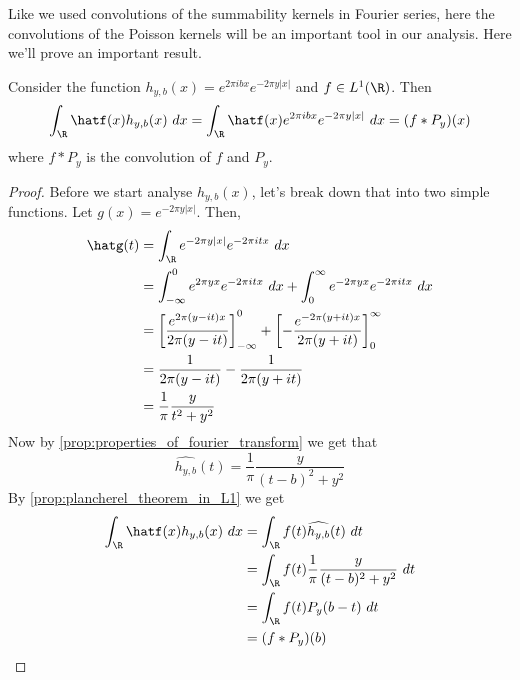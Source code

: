 Like we used convolutions of the summability kernels in Fourier series, here the convolutions of the Poisson kernels will be an important tool in our analysis. Here we'll prove an important result. 
\begin{proposition}
\label{prop:convolution_of_poisson_kernel}
  Consider the function $h_{y,b}(x) = e^{2\pi i b x}e^{-2 \pi y|x|} $ and $f \in L^1(\R)$. Then $$\int_\R \hatf(x)h_{y, b}(x) \ dx = \int_\R \hatf(x) e^{2\pi i b x}e^{-2\pi y |x|} \ dx = (f*P_y)(x)$$
  where $f*P_y$ is the convolution of $f$ and $P_y$.
\end{proposition}
\begin{proof}
  Before we start analyse $h_{y, b}(x)$, let's break down that into two simple functions. Let $g(x) = e^{-2\pi y |x|}$. Then, 
  \begin{align*}
    \hatg(t) &= \int_\R e^{-2 \pi y |x|}e^{-2\pi i t x } \ dx \\
            &= \int_{-\infty}^0 e^{2 \pi y x}e^{-2\pi itx} \ dx + \int_0^\infty e^{-2\pi yx}e^{-2\pi itx} \ dx \\
            &= \left[\frac{e^{2\pi(y-it)x}}{2\pi (y - it)}\right]_{-\infty}^0 + \left[-\frac{e^{-2\pi(y+it)x}}{2\pi (y + it)}\right]^{\infty}_0 \\
            &= \frac{1}{2\pi (y-it)} - \frac{1}{2\pi (y+it)} \\
            &= \frac{1}{\pi}\frac{y}{t^2 + y^2}
  \end{align*}
  Now by \autoref{prop:properties_of_fourier_transform} we get that $$\widehat{h_{y, b}}(t) = \frac{1}{\pi}\frac{y}{(t-b)^2 + y^2}$$
  By \autoref{prop:plancherel_theorem_in_L1} we get
  \begin{align*}
    \int_\R \hatf(x) h_{y, b}(x) \ dx &= \int_\R f(t) \widehat{h_{y,b}}(t)\ dt \\
                &= \int_\R f(t) \frac{1}{\pi} \frac{y}{(t-b)^2 + y^2} \ dt \\
                &= \int_\R f(t) P_y(b-t) \ dt \\
                &= (f*P_y)(b)
  \end{align*}
\end{proof}

